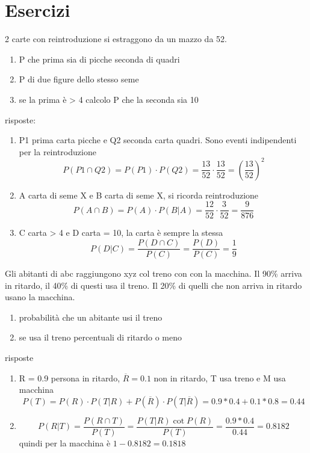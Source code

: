 \documentclass[a4paper,12pt, oneside]{book}
\begin{document}
\section{Esercizi}
\begin{esercizio}
2 carte con reintroduzione si estraggono da un mazzo da 52.
\begin{enumerate}

\item P che prima sia di picche seconda di quadri
\item P di due figure dello stesso seme
\item se la prima è > 4 calcolo P che la seconda sia 10

\end{enumerate}
risposte:
\begin{enumerate}

\item P1 prima carta picche e Q2 seconda carta quadri. Sono eventi indipendenti per la reintroduzione
\[P(P1\cap Q2)=P(P1)\cdot P(Q2)=\frac{13}{52}\cdot \frac{13}{52}=\left(\frac{13}{52}\right)^2\]
\item A carta di seme X e B carta di seme X, si ricorda reintroduzione
\[P(A\cap B)=P(A)\cdot P(B|A)=\frac{12}{52}\cdot \frac{3}{52}= \frac{9}{876}\]
\item C carta > 4 e D carta = 10, la carta è sempre la stessa
\[P(D|C)=\frac{P(D\cap C)}{P(C)}=\frac{P(D)}{P(C)}=\frac{1}{9}\]
\end{enumerate}
\end{esercizio}
\begin{esercizio}
Gli abitanti di abc raggiungono xyz col treno con con la macchina. Il 90\% arriva in ritardo, il 40\% di questi usa il treno. Il 20\% di quelli che non arriva in ritardo usano la macchina.
\begin{enumerate}
\item probabilità che un abitante usi il treno
\item se usa il treno percentuali di ritardo o meno
\end{enumerate}
risposte
\begin{enumerate}
\item R = 0.9 persona in ritardo, $\overline{R}=0.1$ non in ritardo, T usa treno e M usa macchina\\
\[P(T)=P(R)\cdot P(T|R)+P(\overline{R})\cdot P(T|\overline{R})=0.9*0.4+0.1*0.8=0.44\]
\item \[P(R|T)=\frac{P(R\cap T)}{P(T)}=\frac{P(T|R)\cot P(R)}{P(T)}=\frac{0.9*0.4}{0.44}=0.8182\]
quindi per la macchina è $1-0.8182=0.1818$
\end{enumerate}
\end{esercizio}
\end{document}
